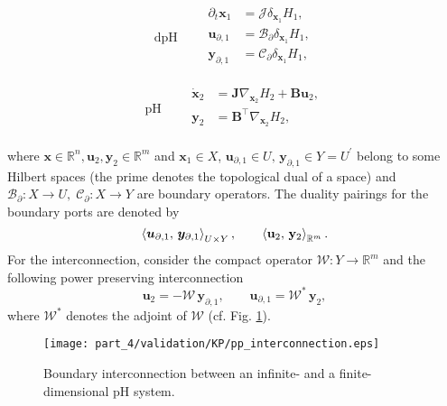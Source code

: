 \noindent
\begin{minipage}{.45\linewidth}
	\begin{equation}
	\text{dpH}\qquad
	\begin{aligned}
	\partial_t \bm{x}_1 &= \mathcal{J} \delta_{\bm{x}_1} {H_1}, \\
	\bm{u}_{\partial, 1}  &= \mathcal{B}_\partial \delta_{\bm{x}_1} {H_1}, \\
	\bm{y}_{\partial, 1} &= \mathcal{C}_\partial \delta_{\bm{x}_1} {H_1}, \\
	\end{aligned}
	\end{equation}
\end{minipage}
\begin{minipage}{.5\linewidth}
	\begin{equation}
	\text{pH} \qquad
	\begin{aligned}
	\dot{\mathbf{x}}_2 &= \mathbf{J} \nabla_{\mathbf{x}_2} {H_2} + \mathbf{B} \mathbf{u}_2, \\
	\mathbf{y}_{2} &= \mathbf{B}^\top \nabla_{\mathbf{x}_2} {H_2}, \\
	\end{aligned}
	\end{equation}
\end{minipage} %

where $\mathbf{x} \in \mathbb{R}^n, \mathbf{u}_2, \mathbf{y}_2 \in \mathbb{R}^m$ and $\bm{x}_1 \in {X}$,  $\bm{u}_{\partial, 1}  \in {U}, \, \bm{y}_{\partial, 1} \in  {Y} = {U}^\prime$ belong to some Hilbert spaces (the prime denotes the topological dual of a space)  and  $\mathcal{B}_\partial: {X} \rightarrow {U}, \; \mathcal{C}_\partial: {X} \rightarrow {Y}$ are boundary operators. The duality pairings for the boundary ports are denoted by
\[
\inner[{U} \times {Y}]{\bm{u}_{\partial, 1}}{\bm{y}_{\partial, 1}},  \qquad
\inner[\mathbb{R}^m]{\mathbf{u}_{2}}{\mathbf{y}_{2}}.
\]
For the interconnection, consider the compact operator $\mathcal{W}: Y \rightarrow \mathbb{R}^m$ and the following power preserving interconnection
\begin{equation}
\label{eq:int_inf}
\mathbf{u}_2 = -\mathcal{W} \, \bm{y}_{\partial, 1},  \qquad \bm{u}_{\partial, 1} = \mathcal{W}^* \, \mathbf{y}_2,
\end{equation}
where $\mathcal{W}^*$ denotes the adjoint of $\mathcal{W}$ (cf. Fig. \ref{fig:interconnection_dpH_pH}). 
\begin{figure}[tb]
	\centering
	\texttt{[image: part\_4/validation/KP/pp\_interconnection.eps]} 
	\caption{Boundary interconnection between an infinite- and a finite-dimensional pH system.}
	\label{fig:interconnection_dpH_pH}
\end{figure}

